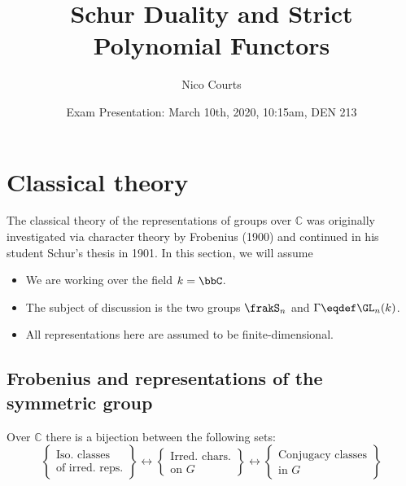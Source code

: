 \documentclass[12pt]{article}
\begin{document}
\title{Schur Duality and Strict Polynomial Functors}
\author{Nico Courts}
\date{Exam Presentation: March 10th, 2020, 10:15am, DEN 213}
\maketitle

\setcounter{tocdepth}{2}
\tableofcontents

\newpage

\section{Classical theory}
	The classical theory of the representations of groups over $\mathbb C$ was originally investigated 
	via character theory by Frobenius \cite{frobenius-charaktere} (1900) and continued in his student Schur's thesis \cite{schur-thesis} in 1901.
	In this section, we will assume 
	\begin{itemize}
		\item We are working over the field $k=\bbC$.
		\item The subject of discussion is the two groups $\frakS_n$ and $\Gamma\eqdef\GL_n(k)$.
		\item All representations here are assumed to be finite-dimensional.
	\end{itemize}
	\subsection{Frobenius and representations of the symmetric group}
		\begin{thm}
			Over $\mathbb C$ there is a bijection between the following sets: 
			\[\begin{Bmatrix}\text{Iso. classes}\\\text{of irred. reps.}\end{Bmatrix}\leftrightarrow\begin{Bmatrix}
				\text{Irred. chars.}\\\text{on $G$}
			\end{Bmatrix}\leftrightarrow \begin{Bmatrix}
				\text{Conjugacy classes}\\\text{in $G$}
			\end{Bmatrix}\]
		\end{thm}
\end{document}
